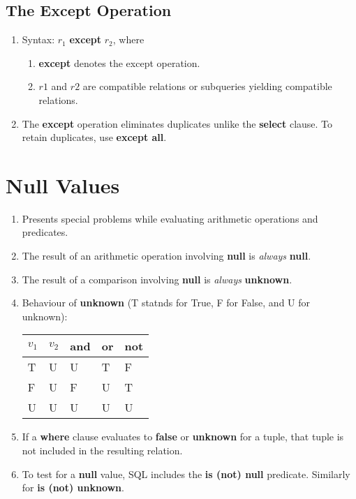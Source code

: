 \documentclass[journal,12pt,twocolumn]{IEEEtran}
\begin{document}
\subsection{The Except Operation}
\begin{enumerate}
    \item Syntax: $r_1$ \textbf{except} $r_2$, where
    \begin{enumerate}
        \item \textbf{except} denotes the except operation.
        \item $r1$ and $r2$ are compatible relations or subqueries yielding 
        compatible relations.
    \end{enumerate}
    \item The \textbf{except} operation eliminates duplicates unlike the 
    \textbf{select} clause. To retain duplicates, use \textbf{except all}.
\end{enumerate}

\section{Null Values}
\begin{enumerate}
    \item Presents special problems while evaluating arithmetic operations and
    predicates.
    \item The result of an arithmetic operation involving \textbf{null} is 
    \textit{always} \textbf{null}.
    \item The result of a comparison involving \textbf{null} is \textit{always} 
    \textbf{unknown}.
    \item Behaviour of \textbf{unknown} (T statnds for True, F for False, and U
    for unknown):
    
    \begin{table}[!ht]
        \centering
        \begin{tabularx}{\columnwidth}{|X|X|X|X|X|}
            \hline
            \textbf{$v_1$} & \textbf{$v_2$} & \textbf{and} & 
            \textbf{or} & \textbf{not} \\ 
            \hline
            T & U & U & T & F \\
            \hline
            F & U & F & U & T \\
            \hline
            U & U & U & U & U \\
            \hline
        \end{tabularx}
    \end{table}
    
    \item If a \textbf{where} clause evaluates to \textbf{false} or 
    \textbf{unknown} for a tuple, that tuple is not included in the resulting 
    relation.
    \item To test for a \textbf{null} value, SQL includes the \textbf{is (not)
    null} predicate. Similarly for \textbf{is (not) unknown}.
\end{enumerate}
\end{document}
